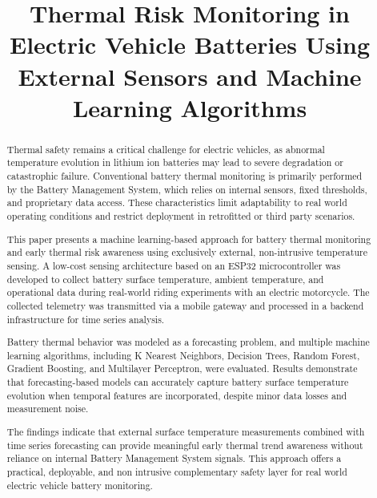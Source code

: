 \documentclass[conference]{IEEEtran}
\begin{document}
\title{Thermal Risk Monitoring in Electric Vehicle Batteries Using External Sensors and Machine Learning Algorithms}

\author{
}

\maketitle

\begin{abstract}
Thermal safety remains a critical challenge for electric vehicles, as abnormal temperature evolution in lithium ion batteries may lead to severe degradation or catastrophic failure. Conventional battery thermal monitoring is primarily performed by the Battery Management System, which relies on internal sensors, fixed thresholds, and proprietary data access. These characteristics limit adaptability to real world operating conditions and restrict deployment in retrofitted or third party scenarios.

This paper presents a machine learning-based approach for battery thermal monitoring and early thermal risk awareness using exclusively external, non-intrusive temperature sensing. A low-cost sensing architecture based on an ESP32 microcontroller was developed to collect battery surface temperature, ambient temperature, and operational data during real-world riding experiments with an electric motorcycle. The collected telemetry was transmitted via a mobile gateway and processed in a backend infrastructure for time series analysis.

Battery thermal behavior was modeled as a forecasting problem, and multiple machine learning algorithms, including K Nearest Neighbors, Decision Trees, Random Forest, Gradient Boosting, and Multilayer Perceptron, were evaluated. Results demonstrate that forecasting-based models can accurately capture battery surface temperature evolution when temporal features are incorporated, despite minor data losses and measurement noise.

The findings indicate that external surface temperature measurements combined with time series forecasting can provide meaningful early thermal trend awareness without reliance on internal Battery Management System signals. This approach offers a practical, deployable, and non intrusive complementary safety layer for real world electric vehicle battery monitoring.
\end{abstract}
\end{document}
